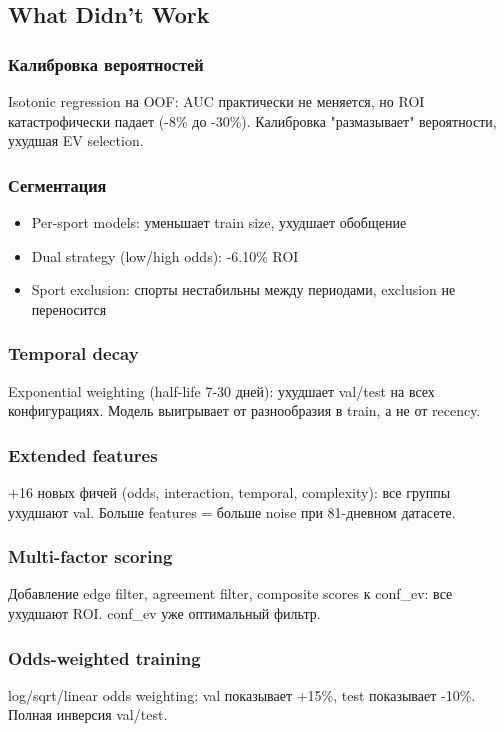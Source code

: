 \documentclass[12pt,a4paper]{article}
\begin{document}
\subsection{What Didn't Work}

\subsubsection{Калибровка вероятностей}
Isotonic regression на OOF: AUC практически не меняется, но ROI катастрофически падает (-8\% до -30\%). Калибровка "размазывает" вероятности, ухудшая EV selection.

\subsubsection{Сегментация}
\begin{itemize}
  \item Per-sport models: уменьшает train size, ухудшает обобщение
  \item Dual strategy (low/high odds): -6.10\% ROI
  \item Sport exclusion: спорты нестабильны между периодами, exclusion не переносится
\end{itemize}

\subsubsection{Temporal decay}
Exponential weighting (half-life 7-30 дней): ухудшает val/test на всех конфигурациях. Модель выигрывает от разнообразия в train, а не от recency.

\subsubsection{Extended features}
+16 новых фичей (odds, interaction, temporal, complexity): все группы ухудшают val. Больше features = больше noise при 81-дневном датасете.

\subsubsection{Multi-factor scoring}
Добавление edge filter, agreement filter, composite scores к conf\_ev: все ухудшают ROI. conf\_ev уже оптимальный фильтр.

\subsubsection{Odds-weighted training}
log/sqrt/linear odds weighting: val показывает +15\%, test показывает -10\%. Полная инверсия val/test.
\end{document}
